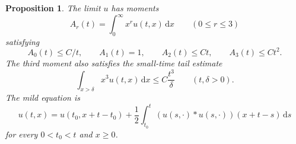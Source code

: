 \documentclass[11pt,letterpaper,reqno]{amsart}
\theoremstyle{plain}
\newtheorem{proposition}[theorem]{Proposition}
\newcommand{\dd}{\,\mathrm d}
\begin{document}
\begin{proposition}\label{prop:limit}
The limit $u$ has moments
\[
 A_r(t)=\int_0^\infty x^ru(t,x)\dd x\qquad(0\le r\le3)
\]
satisfying
\begin{equation}\label{eq:Amoment}
 A_0(t)\le C/t,\qquad A_1(t)=1,\qquad A_2(t)\le Ct,\qquad A_3(t)\le Ct^2.
\end{equation}
The third moment also satisfies the small-time tail estimate
\begin{equation}\label{eq:limitthirdtail}
 \int_{x>\delta}x^3u(t,x)\dd x\le C\frac{t^3}{\delta}\qquad(t,\delta>0).
\end{equation}
The mild equation is
\begin{equation}\label{eq:mild}
 u(t,x)=u(t_0,x+t-t_0)+\frac12\int_{t_0}^t(u(s,\cdot)*u(s,\cdot))(x+t-s)\dd s
\end{equation}
for every $0<t_0<t$ and $x\ge0$.
\end{proposition}
\end{document}
